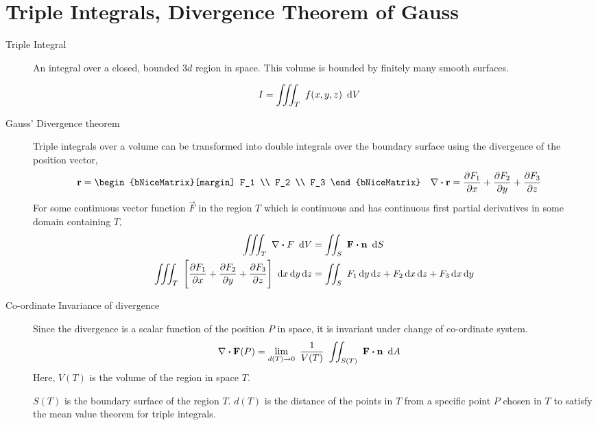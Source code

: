 \section{Triple Integrals, Divergence Theorem of Gauss}

\begin{description}
    \item[Triple Integral] An integral over a closed, bounded $ 3d $ region in space.
        This volume is bounded by finitely many smooth surfaces. \par
        \begin{align}
            I & = \iiint_T\ f(x, y, z)\ \dl V
        \end{align}

    \item[Gauss' Divergence theorem] Triple integrals over a volume can be transformed
        into double integrals over the boundary surface using the divergence of the
        position vector,
        \begin{align}
            \vec{r}              & = \begin{bNiceMatrix}[margin]
                                         F_1 \\ F_2 \\ F_3
                                     \end{bNiceMatrix}                       &
            \nabla \dotp \vec{r} & = \diffp {F_1}{x} + \diffp{F_2}{y} + \diffp{F_3}{z}
        \end{align}
        For some continuous vector function $ \vec{F} $ in the region $ T $ which is
        continuous and has continuous first partial derivatives in some domain
        containing $ T $,
        \begin{align}
            \iiint_T\ \nabla \dotp F\ \dl V           &
            = \iint_S\ \vec{F} \dotp \vec{n}\ \dl S                        \\
            \iiint_T\ \Bigg[\diffp {F_1}{x} + \diffp{F_2}{y}
            + \diffp{F_3}{z}\Bigg]\ \dl x \dl y \dl z &
            = \iint_S\ F_1 \dl y \dl z + F_2 \dl x \dl z + F_3 \dl x \dl y \\
        \end{align}

    \item[Co-ordinate Invariance of divergence] Since the divergence is a scalar
        function of the position $ P $ in space, it is invariant under change of
        co-ordinate system.
        \begin{align}
            \nabla \dotp \vec{F}(P) & = \lim_{d(T) \rightarrow 0}
            \ \frac{1}{V(T)}\ \iint_{S(T)}\ \vec{F} \dotp \vec{n}\ \dl A
        \end{align}
        Here, $ V(T) $ is the volume of the region in space $ T $. \par
        $ S(T) $ is the boundary surface of the region $ T $.
        $ d(T) $ is the distance of the points in $ T $ from a specific point $ P $
        chosen in $ T $ to satisfy the mean value theorem for triple integrals.
\end{description}

